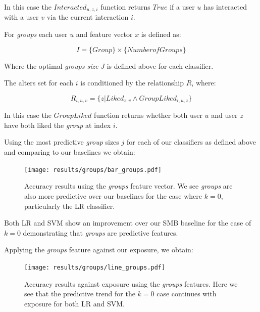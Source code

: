 In this case the $Interacted_{u,z,i}$ function returns $True$ if a user $u$ has interacted with a user $v$ via the current interaction $i$.














For \emph{groups} each user $u$ and feature vector $x$ is defined as:

\[ I = \{Group\} \times \{Number of Groups\} \]

Where the optimal \emph{groups size} $J$ is defined above for each classifier.

The alters set for each $i$ is conditioned by the relationship $R$, where:

\[ R_{i,u,v} = \{z | Liked_{z,v} \wedge GroupLiked_{i,u,z}\} \]

In this case the $GroupLiked$ function returns whether both user $u$ and user $z$ have both liked the \emph{group} at index $i$.

Using the most predictive \emph{group} sizes $j$ for each of our classifiers as defined above and comparing to our baselines we obtain:

\begin{figure}[h]
	\begin{center}
		\texttt{[image: results/groups/bar\_groups.pdf]}
		\caption{Accuracy results using the \emph{groups} feature vector. We see \emph{groups} are also more predictive over our baselines 
				 for the case where $k=0$, particularly the LR classifier.}
	\end{center}
\end{figure}

Both LR and SVM show an improvement over our SMB baseline for the case of $k = 0$ demonstrating that \emph{groups} are predictive features.

\clearpage

Applying the \emph{groups} feature against our exposure, we obtain:

\begin{figure}[h]
	\begin{center}
		\texttt{[image: results/groups/line\_groups.pdf]}
		\caption{Accuracy results against exposure using the \emph{groups} features. Here we see that the predictive trend for the $k=0$
				 case continues with exposure for both LR and SVM.}
	\end{center}
\end{figure}

